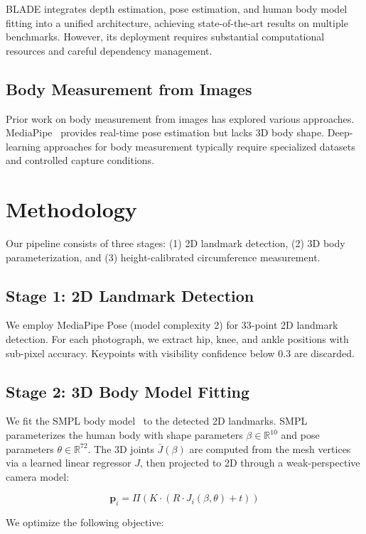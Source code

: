 \documentclass[11pt,a4paper]{article}
\begin{document}
BLADE integrates depth estimation, pose estimation, and human body model fitting into a unified architecture, achieving state-of-the-art results on multiple benchmarks. However, its deployment requires substantial computational resources and careful dependency management.

\subsection{Body Measurement from Images}
Prior work on body measurement from images has explored various approaches. MediaPipe~\cite{mediapipe} provides real-time pose estimation but lacks 3D body shape. Deep-learning approaches for body measurement typically require specialized datasets and controlled capture conditions.

\section{Methodology}

Our pipeline consists of three stages: (1) 2D landmark detection, (2) 3D body parameterization, and (3) height-calibrated circumference measurement.

\subsection{Stage 1: 2D Landmark Detection}
We employ MediaPipe Pose (model complexity 2) for 33-point 2D landmark detection. For each photograph, we extract hip, knee, and ankle positions with sub-pixel accuracy. Keypoints with visibility confidence below 0.3 are discarded.

\subsection{Stage 2: 3D Body Model Fitting}
We fit the SMPL body model~\cite{smpl} to the detected 2D landmarks. SMPL parameterizes the human body with shape parameters $\beta \in \mathbb{R}^{10}$ and pose parameters $\theta \in \mathbb{R}^{72}$. The 3D joints $\bar{J}(\beta)$ are computed from the mesh vertices via a learned linear regressor $J$, then projected to 2D through a weak-perspective camera model:

\begin{equation}
\mathbf{p}_i = \Pi(K \cdot (R \cdot J_i(\beta, \theta) + t))
\end{equation}

We optimize the following objective:
\end{document}
